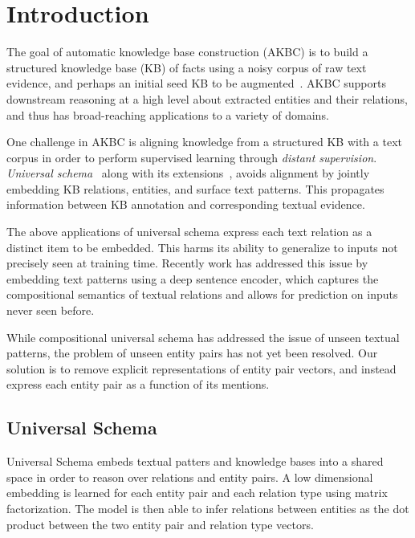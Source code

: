 
\section{Introduction\label{introduction}}

The goal of automatic knowledge base construction (AKBC) is to build a structured knowledge base (KB) of facts using a noisy corpus of raw text evidence, and perhaps an initial seed KB to be augmented~\citep{NELL,yago,freebase}. AKBC supports downstream reasoning at a high level about extracted entities and their relations, and thus has broad-reaching applications to a variety of domains.

One challenge in AKBC is aligning knowledge from a structured KB with a text corpus in order to perform supervised learning through \emph{distant supervision}. \emph{Universal schema}~\citep{limin} along with its extensions~\citep{yao2013universal,vector_pra,neelakantan2015compositional,logicmfnaacl15}, avoids alignment by jointly embedding KB relations, entities, and surface text patterns. This propagates information between KB annotation and corresponding textual evidence.

The above applications of universal schema express each text relation as a distinct item to be embedded. This harms its ability to generalize to inputs not precisely seen at training time. Recently work \citep{toutanova2015representing,verga2015multilingual} has addressed this issue by embedding text patterns using a deep sentence encoder, which captures the compositional semantics of textual relations and allows for prediction on inputs never seen before.

While compositional universal schema has addressed the issue of unseen textual patterns, the problem of unseen entity pairs has not yet been resolved. Our solution is to remove explicit representations of entity pair vectors, and instead express each entity pair as a function of its mentions.


\subsection {Universal Schema}

Universal Schema embeds textual patters and knowledge bases into a shared space in order to reason over relations and entity pairs.
A low dimensional embedding is learned for each entity pair and each relation type using matrix factorization.
The model is then able to infer relations between entities as the dot product between the two entity pair and relation type vectors.

